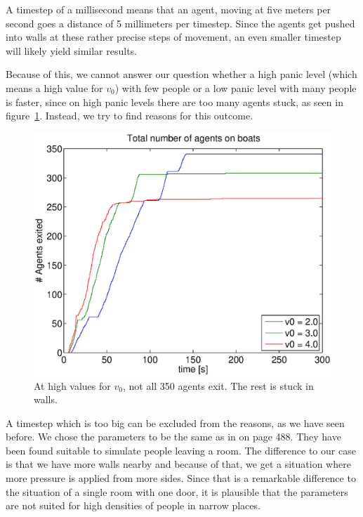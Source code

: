 \documentclass[11pt]{article}
\begin{document}
A timestep of a millisecond means that an agent, moving at five meters per
second goes a distance of 5 millimeters per timestep. Since the agents get
pushed into walls at these rather precise steps of movement, an even smaller
timestep will likely yield similar results. 


Because of this, we cannot answer our question whether a high panic level
(which means a high value for \(v_0\)) with few people or a low panic level
with many people is faster, since on high panic levels there are too many
agents stuck, as seen in figure~\ref{v0plotwallhang}. Instead, we try to find
reasons for this outcome.

\begin{figure}[h]
	\centering
	\includegraphics[scale=0.5]{images/v0plotwallhang.eps}
    \caption{At high values for \(v_0\), not all 350 agents exit. The rest is
    stuck in walls.}
	\label{v0plotwallhang}
\end{figure}

A timestep which is too big can be excluded from the reasons, as we have seen
before.  We chose the parameters to be the same as in \cite{helbing} on page
488.  They have been found suitable to simulate people leaving a room.  The
difference to our case is that we have more walls nearby and because of that,
we get a situation where more pressure is applied from more sides.  Since that
is a remarkable difference to the situation of a single room with one door, it
is plausible that the parameters are not suited for high densities of people in
narrow places. 
\end{document}
